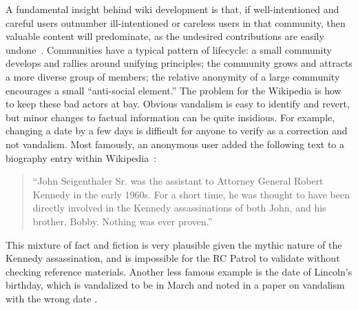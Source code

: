 A fundamental insight behind wiki development is that,
if well-intentioned and careful users outnumber ill-intentioned
or careless users in that community, then valuable content will predominate,
as the undesired contributions are easily undone~\cite{Wikis01}.
Communities have a typical pattern of lifecycle:
a small community develops and rallies around unifying principles;
the community grows and attracts a more diverse group of members;
the relative anonymity of a large community encourages
a small ``anti-social element.''
The problem for the Wikipedia is how to keep these bad actors at bay.
Obvious vandalism is easy to identify and revert,
but minor changes to factual information can be quite insidious.
For example, changing a date by a few days is difficult for anyone
to verify as a correction and not vandalism.
Most famously, an anonymous user added the following text to a biography entry
within Wikipedia~\cite{Seigenthaler05,NewYorkTimes05a,NewYorkTimes05b}:
\begin{quote}
``John Seigenthaler Sr. was the assistant to
Attorney General Robert Kennedy in the early 1960s.
For a short time, he was thought to have been directly involved
in the Kennedy assassinations of both John, and his brother, Bobby.
Nothing was ever proven.''
\end{quote}
This mixture of fact and fiction is very plausible given the
mythic nature of the Kennedy assassination, and is impossible
for the RC Patrol to validate without checking reference materials.
Another less famous example is the date of Lincoln's birthday,
which is vandalized to be in March  and noted in a paper on vandalism with the wrong
date .


